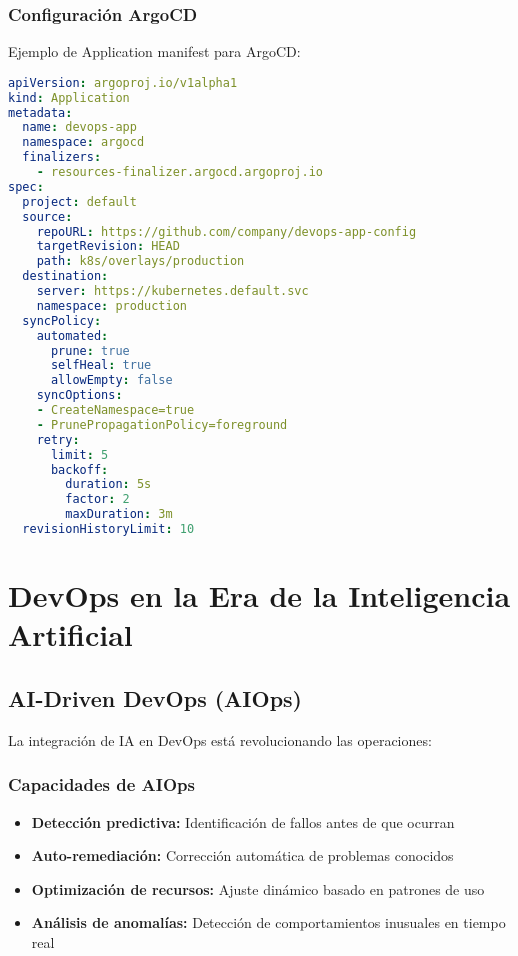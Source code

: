 \documentclass[12pt,a4paper]{article}
\begin{document}
\subsubsection{Configuración ArgoCD}
Ejemplo de Application manifest para ArgoCD:
\begin{lstlisting}[language=yaml, caption=ArgoCD Application Configuration]
apiVersion: argoproj.io/v1alpha1
kind: Application
metadata:
  name: devops-app
  namespace: argocd
  finalizers:
    - resources-finalizer.argocd.argoproj.io
spec:
  project: default
  source:
    repoURL: https://github.com/company/devops-app-config
    targetRevision: HEAD
    path: k8s/overlays/production
  destination:
    server: https://kubernetes.default.svc
    namespace: production
  syncPolicy:
    automated:
      prune: true
      selfHeal: true
      allowEmpty: false
    syncOptions:
    - CreateNamespace=true
    - PrunePropagationPolicy=foreground
    retry:
      limit: 5
      backoff:
        duration: 5s
        factor: 2
        maxDuration: 3m
  revisionHistoryLimit: 10
\end{lstlisting}

\section{DevOps en la Era de la Inteligencia Artificial}

\subsection{AI-Driven DevOps (AIOps)}
La integración de IA en DevOps está revolucionando las operaciones:

\subsubsection{Capacidades de AIOps}
\begin{itemize}
    \item \textbf{Detección predictiva:} Identificación de fallos antes de que ocurran
    \item \textbf{Auto-remediación:} Corrección automática de problemas conocidos
    \item \textbf{Optimización de recursos:} Ajuste dinámico basado en patrones de uso
    \item \textbf{Análisis de anomalías:} Detección de comportamientos inusuales en tiempo real
\end{itemize}
\end{document}
